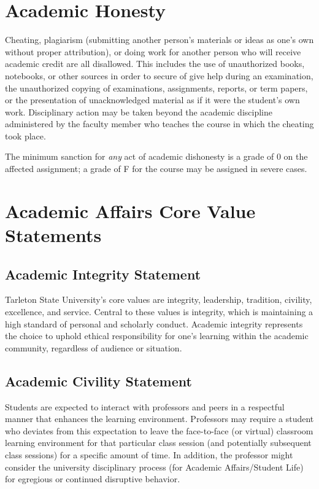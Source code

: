 \documentclass[10pt]{article}
\begin{document}
\section*{Academic Honesty}
\label{sec:orgd63a52b}

Cheating, plagiarism (submitting another person’s materials or ideas as one’s own without proper attribution), or doing work for another person who will receive academic credit are all disallowed. This includes the use of unauthorized books, notebooks, or other sources in order to secure of give help during an examination, the unauthorized copying of examinations, assignments, reports, or term papers, or the presentation of unacknowledged material as if it were the student’s own work. Disciplinary action may be taken beyond the academic discipline administered by the faculty member who teaches the course in which the cheating took place.

The minimum sanction for \emph{any} act of academic dishonesty is a grade of 0 on the affected assignment; a grade of F for the course may be assigned in severe cases.

\section*{Academic Affairs Core Value Statements}
\label{sec:orgaf8713e}

\subsection*{Academic Integrity Statement}
\label{sec:org8a272fb}
Tarleton State University's core values are integrity, leadership, tradition, civility, excellence, and service.  Central to these values is integrity, which is maintaining a high standard of personal and scholarly conduct.  Academic integrity represents the choice to uphold ethical responsibility for one’s learning within the academic community, regardless of audience or situation.

\subsection*{Academic Civility Statement}
\label{sec:orgff77866}
Students are expected to interact with professors and peers in a respectful manner that enhances the learning environment. Professors may require a student who deviates from this expectation to leave the face-to-face (or virtual) classroom learning environment for that particular class session (and potentially subsequent class sessions) for a specific amount of time. In addition, the professor might consider the university disciplinary process (for Academic Affairs/Student Life) for egregious or continued disruptive behavior.
\end{document}

